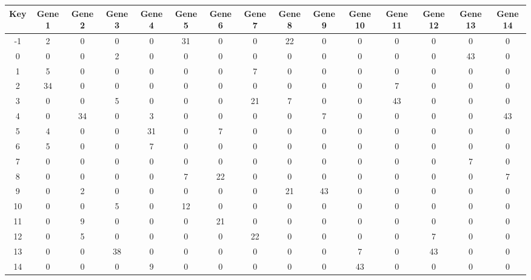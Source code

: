 \begin{tabular}{|c|c|c|c|c|c|c|c|c|c|c|c|c|c|c|}
\hline
Key & Gene 1 & Gene 2 & Gene 3 & Gene 4 & Gene 5 & Gene 6 & Gene 7 & Gene 8 & Gene 9 & Gene 10 & Gene 11 & Gene 12 & Gene 13 & Gene 14 \\
\hline
-1 & 2 & 0 & 0 & 0 & 31 & 0 & 0 & 22 & 0 & 0 & 0 & 0 & 0 & 0 \\
0 & 0 & 0 & 2 & 0 & 0 & 0 & 0 & 0 & 0 & 0 & 0 & 0 & 43 & 0 \\
1 & 5 & 0 & 0 & 0 & 0 & 0 & 7 & 0 & 0 & 0 & 0 & 0 & 0 & 0 \\
2 & 34 & 0 & 0 & 0 & 0 & 0 & 0 & 0 & 0 & 0 & 7 & 0 & 0 & 0 \\
3 & 0 & 0 & 5 & 0 & 0 & 0 & 21 & 7 & 0 & 0 & 43 & 0 & 0 & 0 \\
4 & 0 & 34 & 0 & 3 & 0 & 0 & 0 & 0 & 7 & 0 & 0 & 0 & 0 & 43 \\
5 & 4 & 0 & 0 & 31 & 0 & 7 & 0 & 0 & 0 & 0 & 0 & 0 & 0 & 0 \\
6 & 5 & 0 & 0 & 7 & 0 & 0 & 0 & 0 & 0 & 0 & 0 & 0 & 0 & 0 \\
7 & 0 & 0 & 0 & 0 & 0 & 0 & 0 & 0 & 0 & 0 & 0 & 0 & 7 & 0 \\
8 & 0 & 0 & 0 & 0 & 7 & 22 & 0 & 0 & 0 & 0 & 0 & 0 & 0 & 7 \\
9 & 0 & 2 & 0 & 0 & 0 & 0 & 0 & 21 & 43 & 0 & 0 & 0 & 0 & 0 \\
10 & 0 & 0 & 5 & 0 & 12 & 0 & 0 & 0 & 0 & 0 & 0 & 0 & 0 & 0 \\
11 & 0 & 9 & 0 & 0 & 0 & 21 & 0 & 0 & 0 & 0 & 0 & 0 & 0 & 0 \\
12 & 0 & 5 & 0 & 0 & 0 & 0 & 22 & 0 & 0 & 0 & 0 & 7 & 0 & 0 \\
13 & 0 & 0 & 38 & 0 & 0 & 0 & 0 & 0 & 0 & 7 & 0 & 43 & 0 & 0 \\
14 & 0 & 0 & 0 & 9 & 0 & 0 & 0 & 0 & 0 & 43 & 0 & 0 & 0 & 0 \\
\hline
\end{tabular}